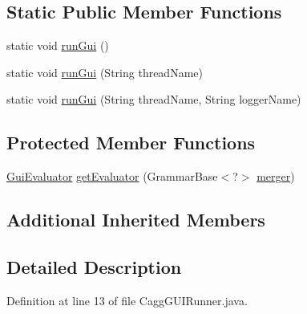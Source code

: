 \subsection*{Static Public Member Functions}
\begin{DoxyCompactItemize}
\item 
static void \hyperlink{classit_1_1emarolab_1_1cagg_1_1interfaces_1_1CaggGUIRunner_ad8bdc4f6feb4f5196524902e24537351}{run\-Gui} ()
\item 
static void \hyperlink{classit_1_1emarolab_1_1cagg_1_1interfaces_1_1CaggGUIRunner_ab6ac233150539e5744c49e2856c26163}{run\-Gui} (String thread\-Name)
\item 
static void \hyperlink{classit_1_1emarolab_1_1cagg_1_1interfaces_1_1CaggGUIRunner_a491cf236021e2aee3ad0bf142cf47a2b}{run\-Gui} (String thread\-Name, String logger\-Name)
\end{DoxyCompactItemize}
\subsection*{Protected Member Functions}
\begin{DoxyCompactItemize}
\item 
\hyperlink{classit_1_1emarolab_1_1cagg_1_1core_1_1evaluation_1_1GuiEvaluator}{Gui\-Evaluator} \hyperlink{classit_1_1emarolab_1_1cagg_1_1interfaces_1_1CaggGUIRunner_ac9dc367a2ab79eb214516e7b54b55a45}{get\-Evaluator} (Grammar\-Base$<$?$>$ \hyperlink{classit_1_1emarolab_1_1cagg_1_1debugging_1_1DebuggingGui_a03d18ffb6d8ab6c84ad429c8dac4b886}{merger})
\end{DoxyCompactItemize}
\subsection*{Additional Inherited Members}


\subsection{Detailed Description}


Definition at line 13 of file Cagg\-G\-U\-I\-Runner.\-java.



